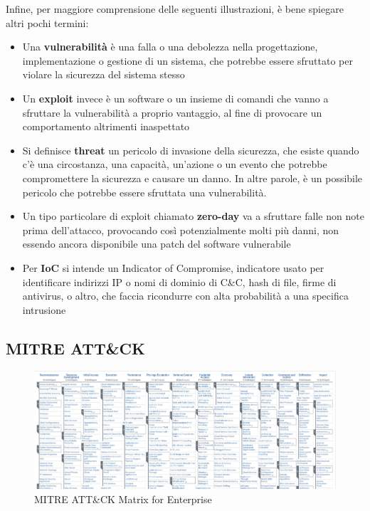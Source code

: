 Infine, per maggiore comprensione delle seguenti illustrazioni, è bene spiegare altri pochi termini:
\begin{itemize}
    \item Una \textbf{vulnerabilità} è una falla o una debolezza nella progettazione, implementazione o gestione di un sistema, che potrebbe essere sfruttato per violare la sicurezza del sistema stesso \cite{rfc4949}
    \item Un \textbf{exploit} invece è un software o un insieme di comandi che vanno a sfruttare la vulnerabilità a proprio vantaggio, al fine di provocare un comportamento altrimenti inaspettato
    \item Si definisce \textbf{threat} un pericolo di invasione della sicurezza, che esiste quando c'è una circostanza, una capacità,
    un'azione o un evento che potrebbe compromettere la sicurezza e causare un danno.
    In altre parole, è un possibile pericolo che potrebbe essere sfruttata una vulnerabilità. \cite{rfc4949}
    \item Un tipo particolare di exploit chiamato \textbf{zero-day} va a sfruttare falle non note prima dell'attacco, provocando così potenzialmente molti più danni, non essendo ancora disponibile una patch del software vulnerabile
    \item Per \textbf{IoC} si intende un Indicator of Compromise, indicatore usato per identificare indirizzi IP o nomi di dominio di C\&C, hash di file, firme di antivirus, o altro, che faccia ricondurre con alta probabilità a una specifica intrusione
\end{itemize}

\subsection{MITRE ATT\&CK}
\label{chap:mitre_attack}

\begin{figure}[htbp]
    \centering
    \includegraphics[width=\textwidth]{assets/mitre_attack_matrix.png}
    \caption{MITRE ATT\&CK Matrix for Enterprise}
    \label{fig:mitre_attack_matrix}
\end{figure}

